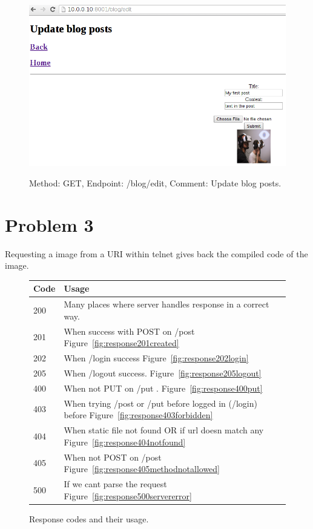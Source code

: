 \documentclass[a4paper,12pt]{article} %
\begin{document}
{\begin{figure}[H]
    \centering  
    \includegraphics[scale=0.4]{img/screenshots/updateblogpost.png}
	\label{fig:updateblogpost}
	\caption{Method: GET, Endpoint: /blog/edit, Comment: Update blog posts.}
\end{figure}


\section{Problem 3}

Requesting a image from a URI within telnet gives back the compiled code of the image.

\begin{figure}[H]
  \centering
  \begin{tabular}{ | l | l | }
    \hline			
    Code & Usage \\
    \hline			
    200 & Many places where server handles response in a correct way. \\
    \hline			
    201 & When success with POST on /post Figure~\ref{fig:response201created} \\
    \hline			
    202 & When /login success Figure~\ref{fig:response202login} \\
    \hline			
    205 & When /logout success. Figure~\ref{fig:response205logout} \\
    \hline			
    400 & When not PUT on /put . Figure~\ref{fig:response400put} \\
    \hline			
    403 & When trying /post or /put before logged in (/login) before Figure~\ref{fig:response403forbidden} \\
    \hline			
    404 & When static file not found OR if url doesn match any Figure~\ref{fig:response404notfound} \\
    \hline			
    405 & When not POST on /post Figure~\ref{fig:response405methodnotallowed} \\
    \hline			
    500 & If we cant parse the request Figure~\ref{fig:response500servererror} \\
    \hline  
  \end{tabular}
  \label{fig:responsecodesandusage}
  \caption{Response codes and their usage.}
\end{figure}

}
\end{document}
